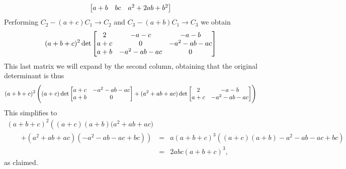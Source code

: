 \begin{pro}
\begin{answer}
$$\begin{bmatrix}
a+b & bc & a^2+2ab+b^2 \cr
\end{bmatrix}$$
Performing $C_2-(a+c)C_1\to C_2$ and $C_3-(a+b)C_1\to C_3$ we obtain
 $$(a+b+c)^2\det
\begin{bmatrix} 2 & -a-c & -a-b \cr a+c & 0 & -a^2-ab-ac\cr
a+b &-a^2- ab-ac & 0 \cr
\end{bmatrix}$$
This last matrix we will expand by the second column, obtaining that
the original determinant is thus
$$ (a+b+c)^2\left((a+c)\det\begin{bmatrix}a+c & -a^2-ab-ac \cr  a+b & 0  \end{bmatrix} +(a^2+ab+ac)\det\begin{bmatrix} 2 & -a-b \cr a+c & -a^2-ab-ac \end{bmatrix}\right)  $$
This simplifies to
$$\begin{array}{lll}
(a+b+c)^2\left((a+c)(a+b)(a^2+ab+ac\right.)\\
\qquad \left.+(a^2+ab+ac)(-a^2-ab-ac+bc)\right) & = &
a(a+b+c)^3((a+c)(a+b)-a^2-ab-ac+bc)\\ & = &
2abc(a+b+c)^3,\end{array}
$$ as claimed.




\end{answer}


\end{pro}

